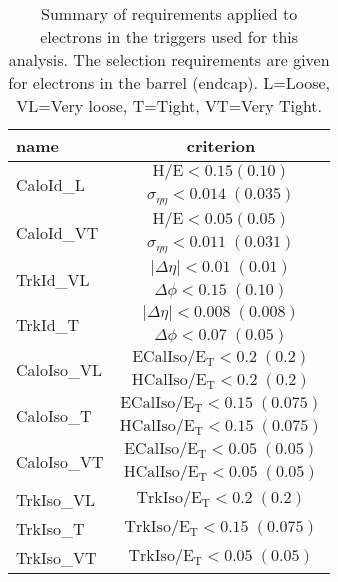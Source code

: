 \begin{table}[!ht]
 \caption{Summary of requirements applied to electrons in the triggers used for this analysis.
The selection requirements are given for electrons in the barrel (endcap).
L=Loose, VL=Very loose, T=Tight, VT=Very Tight.}
    \vspace{5pt}
 \label{tab:HLTElectronCuts}
 \centering
 \begin{tabular}{l|c}
   \hline
   name                       &  criterion \\
   \hline \hline
   \multirow{2}{*}{CaloId\_L} & $\mathrm{H/E < 0.15 (0.10) }$ \\
                               & $\sigma_{\eta\eta}\mathrm{< 0.014\;(0.035)}$ \\
    \hline
   \multirow{2}{*}{CaloId\_VT} & $\mathrm{H/E < 0.05 (0.05) }$ \\
                               & $\sigma_{\eta\eta}\mathrm{< 0.011\;(0.031)}$ \\
    \hline \hline
    \multirow{2}{*}{TrkId\_VL} & $|\Delta\eta|\mathrm{< 0.01\; (0.01)}$ \\
                               & $\Delta\phi\mathrm{< 0.15\;(0.10)}$  \\
    \hline
    \multirow{2}{*}{TrkId\_T} & $|\Delta\eta|\mathrm{< 0.008\; (0.008)}$ \\
                               & $\Delta\phi\mathrm{< 0.07\;(0.05)}$  \\
    \hline \hline
    \multirow{2}{*}{CaloIso\_VL} & $\mathrm{ECalIso/E_T <0.2\;(0.2)}$ \\
                                 & $\mathrm{HCalIso/E_T <0.2\;(0.2)}$ \\
    \hline
    \multirow{2}{*}{CaloIso\_T} & $\mathrm{ECalIso/E_T <0.15\;(0.075)}$ \\
                                 & $\mathrm{HCalIso/E_T <0.15\;(0.075)}$ \\
    \hline
    \multirow{2}{*}{CaloIso\_VT} & $\mathrm{ECalIso/E_T <0.05\;(0.05)}$ \\
                                 & $\mathrm{HCalIso/E_T <0.05\;(0.05)}$ \\
    \hline \hline
    TrkIso\_VL                   & $\mathrm{TrkIso/E_T <0.2\;(0.2)}$ \\
    \hline
    TrkIso\_T                   & $\mathrm{TrkIso/E_T <0.15\;(0.075)}$ \\
   \hline
    TrkIso\_VT                   & $\mathrm{TrkIso/E_T <0.05\;(0.05)}$ \\
    \hline
 \end{tabular}
\end{table}

